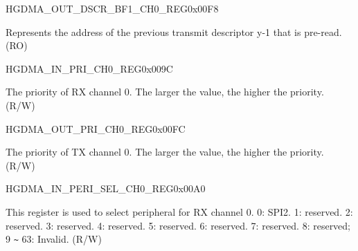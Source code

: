 \begin{register}{H}{GDMA\_OUT\_DSCR\_BF1\_CH0\_REG}{0x00F8}\label{regdesc:GDMAOUTDSCRBF1CH0REG}
%
\regnewline%
\begin{regdesc}\begin{reglist}
\label{fielddesc:GDMAOUTLINKDSCRBF1CH0}\item [GDMA\_OUTLINK\_DSCR\_BF1\_CH0] Represents the address of the previous transmit descriptor y-1 that is pre-read. (RO)
\end{reglist}\end{regdesc}
\end{register}


\begin{register}{H}{GDMA\_IN\_PRI\_CH0\_REG}{0x009C}\label{regdesc:GDMAINPRICH0REG}
%
%
\regnewline%
\begin{regdesc}\begin{reglist}
\label{fielddesc:GDMARXPRICH0}\item [GDMA\_RX\_PRI\_CH0] The priority of RX channel 0. The larger the value, the higher the priority. (R/W)
\end{reglist}\end{regdesc}
\end{register}


\begin{register}{H}{GDMA\_OUT\_PRI\_CH0\_REG}{0x00FC}\label{regdesc:GDMAOUTPRICH0REG}
%
%
\regnewline%
\begin{regdesc}\begin{reglist}
\label{fielddesc:GDMATXPRICH0}\item [GDMA\_TX\_PRI\_CH0] The priority of TX channel 0. The larger the value, the higher the priority. (R/W)
\end{reglist}\end{regdesc}
\end{register}


\begin{register}{H}{GDMA\_IN\_PERI\_SEL\_CH0\_REG}{0x00A0}\label{regdesc:GDMAINPERISELCH0REG}
%
%
\regnewline%
\begin{regdesc}\begin{reglist}
\label{fielddesc:GDMAPERIINSELCH0}\item [GDMA\_PERI\_IN\_SEL\_CH0] This register is used to select peripheral for RX channel 0. 0: SPI2. 1: reserved. 2: reserved. 3: reserved. 4: reserved. 5: reserved. 6: reserved. 7: reserved. 8: reserved; 9 \verb+~+ 63: Invalid. (R/W)
\end{reglist}\end{regdesc}
\end{register}


